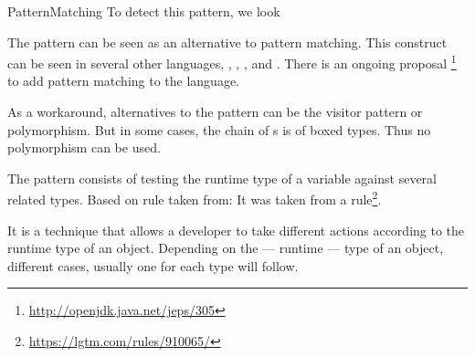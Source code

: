 \begin{pattern}{PatternMatching}
\detection{}
To detect this pattern, we look

\discussion{}
The \thisp{} pattern can be seen as an \adhoc{}
alternative to pattern matching.
This construct can be seen in several other languages, \eg,
\haskell{}, \scala{}, and \cs{}.
There is an ongoing proposal%
\footnote{\url{http://openjdk.java.net/jeps/305}} to add pattern
matching to the \java{} language.

As a workaround, alternatives to the \thisp{} pattern can be the
visitor pattern or polymorphism.
But in some cases, the chain of s is of boxed types.
Thus no polymorphism can be used.


The \thisp{} pattern consists of testing the runtime type of a variable against several related types.
Based on rule taken from:
It was taken from a \lgtm{} rule\footnote{\url{https://lgtm.com/rules/910065/}}.

It is a technique that allows a developer to take different actions according to the runtime type of an object.
Depending on the --- runtime --- type of an object, different cases, usually one for each type will follow.

\end{pattern}
